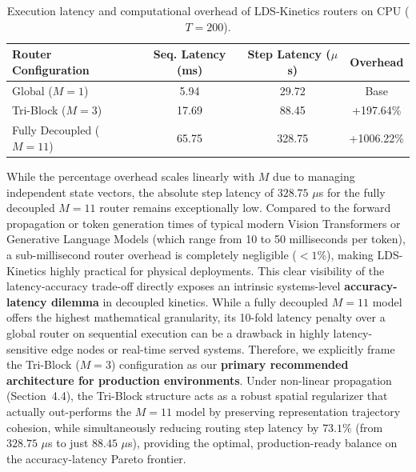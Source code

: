 \begin{table}[h]
\caption{Execution latency and computational overhead of LDS-Kinetics routers on CPU ($T = 200$).}
\label{tab:latency_overhead}
\vskip 0.1in
\begin{center}
\begin{small}
\begin{sc}
\begin{tabular}{lccc}
\toprule
Router Configuration & Seq. Latency (ms) & Step Latency ($\mu$s) & Overhead \\
\midrule
Global ($M=1$) & 5.94 & 29.72 & Base \\
Tri-Block ($M=3$) & 17.69 & 88.45 & +197.64\% \\
Fully Decoupled ($M=11$) & 65.75 & 328.75 & +1006.22\% \\
\bottomrule
\end{tabular}
\end{sc}
\end{small}
\end{center}
\end{table}

While the percentage overhead scales linearly with $M$ due to managing independent state vectors, the absolute step latency of $328.75$ $\mu$s for the fully decoupled $M=11$ router remains exceptionally low. Compared to the forward propagation or token generation times of typical modern Vision Transformers or Generative Language Models (which range from 10 to 50 milliseconds per token), a sub-millisecond router overhead is completely negligible ($<1$\%), making LDS-Kinetics highly practical for physical deployments. This clear visibility of the latency-accuracy trade-off directly exposes an intrinsic systems-level \textbf{accuracy-latency dilemma} in decoupled kinetics. While a fully decoupled $M=11$ model offers the highest mathematical granularity, its 10-fold latency penalty over a global router on sequential execution can be a drawback in highly latency-sensitive edge nodes or real-time served systems. Therefore, we explicitly frame the Tri-Block ($M=3$) configuration as our \textbf{primary recommended architecture for production environments}. Under non-linear propagation (Section~4.4), the Tri-Block structure acts as a robust spatial regularizer that actually out-performs the $M=11$ model by preserving representation trajectory cohesion, while simultaneously reducing routing step latency by $73.1\%$ (from $328.75$ $\mu$s to just $88.45$ $\mu$s), providing the optimal, production-ready balance on the accuracy-latency Pareto frontier.

